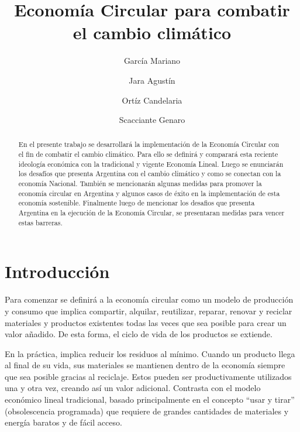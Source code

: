 \documentclass[runningheads]{llncs}
\begin{document}
%
\title{Economía Circular para combatir el cambio climático}
%
%
\author{García Mariano \and
Jara Agustín \and
Ortíz Candelaria \and
Scacciante Genaro}
%
%
%
%
\begin{abstract}
En el presente trabajo se desarrollará la implementación de la Economía Circular con el fin de combatir el cambio climático. Para ello se definirá y comparará esta reciente ideología económica con la tradicional y vigente  Economía Lineal. Luego se enunciarán los desafíos que presenta Argentina con el cambio climático y como se conectan con la economía Nacional.
También se mencionarán algunas medidas para promover la economía circular  en Argentina y algunos casos de éxito en la implementación de esta economía sostenible.
Finalmente luego de mencionar los desafios  que presenta Argentina en la ejecución de la Economía Circular, se presentaran medidas para vencer estas barreras. 


\end{abstract}
%
%
%
\section{Introducción}

\hspace{0.5cm} Para comenzar se definirá a la economía circular como un modelo de producción y consumo que implica compartir, alquilar, reutilizar, reparar, renovar y reciclar materiales y productos existentes todas las veces que sea posible para crear un valor añadido. De esta forma, el ciclo de vida de los productos se extiende.

En la práctica, implica reducir los residuos al mínimo. Cuando un producto llega al final de su vida, sus materiales se mantienen dentro de la economía siempre que sea posible gracias al reciclaje. Estos pueden ser productivamente utilizados una y otra vez, creando así un valor adicional.
Contrasta con el modelo económico lineal tradicional, basado principalmente en el concepto “usar y tirar” (obsolescencia programada) que requiere de grandes cantidades de materiales y energía baratos y de fácil acceso.
\end{document}
